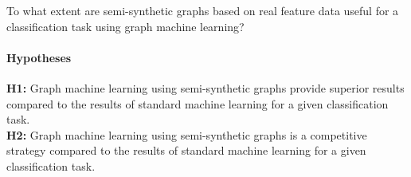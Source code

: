 	\noindent To what extent are semi-synthetic graphs based on real 
				feature data useful for a classification task using graph 
				machine learning?

	\paragraph{Hypotheses}\mbox{}

	\noindent\textbf{H1:} Graph machine learning using semi-synthetic graphs
	provide superior results compared to the results of standard machine
	learning for a given classification task.\\

	\noindent\textbf{H2:} Graph machine learning using semi-synthetic graphs is
	a competitive strategy compared to the results of standard machine
	learning for a given classification task.\\

